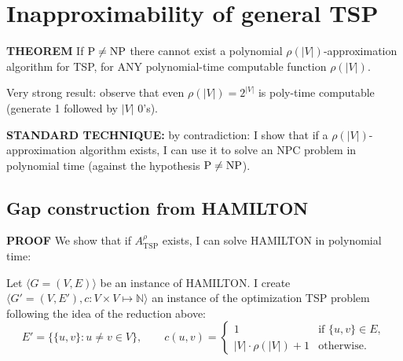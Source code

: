 \section{Inapproximability of general TSP}
\begin{notestheorem}
\textbf{THEOREM} If $\mathrm{P}\ne\mathrm{NP}$ there cannot exist a polynomial $\rho(|V|)$-approximation algorithm for TSP, for ANY polynomial-time computable function $\rho(|V|)$.
\end{notestheorem}
Very strong result: observe that even $\rho(|V|)=2^{|V|}$ is poly-time computable (generate 1 followed by $|V|$ 0's).

\textbf{STANDARD TECHNIQUE:} by contradiction: I show that if a $\rho(|V|)$-approximation algorithm exists, I can use it to solve an NPC problem in polynomial time (against the hypothesis $\mathrm{P}\ne\mathrm{NP}$).

\subsection{Gap construction from HAMILTON}
\textbf{PROOF} We show that if $A_{\mathrm{TSP}}^\rho$ exists, I can solve HAMILTON in polynomial time:

Let $\langle G=(V,E)\rangle$ be an instance of HAMILTON. I create $\langle G'=(V,E'),c:V\times V\mapsto\mathbb N\rangle$ an instance of the optimization TSP problem following the idea of the reduction above:
\[E'=\{\{u,v\}:u\ne v\in V\},\qquad c(u,v)=\begin{cases}
1&\text{if }\{u,v\}\in E,\\
|V|\cdot\rho(|V|)+1&\text{otherwise}.
\end{cases}\]
